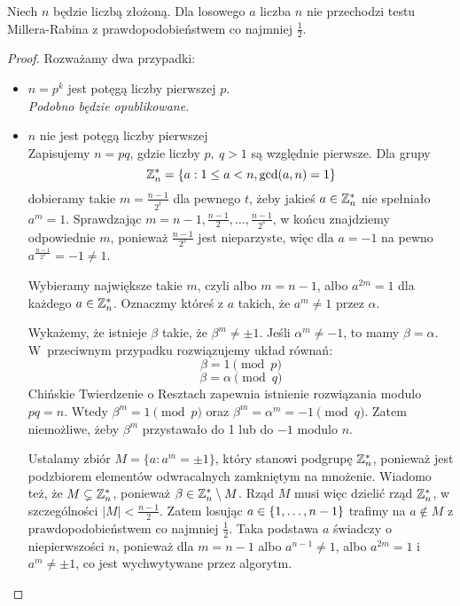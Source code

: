 \newpage
\begin{lemma}
    Niech \( n \) będzie liczbą złożoną. Dla losowego \( a \) liczba \( n \) nie przechodzi testu Millera-Rabina z prawdopodobieństwem co najmniej \( \frac{1}{2} \).
\end{lemma}
\begin{proof}
    Rozważamy dwa przypadki:
    \begin{itemize}
        \item \( n = p^k \) jest potęgą liczby pierwszej \( p \). \\
        \textit{Podobno będzie opublikowane.}
        \item \( n \) nie jest potęgą liczby pierwszej \\
        Zapisujemy \( n = pq \), gdzie liczby \( p, \ q > 1 \) są względnie pierwsze.    
        Dla grupy
        \[
            \integer_n^* = \set{a : 1 \le a < n, \gcd(a,n) = 1}
        \]    
        dobieramy takie \( m = \frac{n-1}{2^t} \) dla pewnego \( t \), żeby jakieś \( a \in \mathbb{Z}_n^* \) nie spełniało \( a^m = 1 \).
        Sprawdzając \( m = n-1, \frac{n-1}{2}, \dots, \frac{n-1}{2^s} \), w końcu znajdziemy odpowiednie \( m \), ponieważ \( \frac{n-1}{2^s} \) jest nieparzyste, więc dla \( a = -1\)  na pewno \( a^{\frac{n-1}{2^s}} = -1 \ne 1 \).

	Wybieramy największe takie \( m \), czyli albo \( m = n - 1 \), albo \( a^{2m} = 1 \) dla każdego \( a \in \mathbb{Z}_n^* \). Oznaczmy któreś z \( a \) takich, że \( a^m \neq 1 \) przez \( \alpha \).
    
        Wykażemy, że istnieje \( \beta \) takie, że \( \beta^m \neq \pm 1 \). Jeśli \( \alpha^m \neq -1 \), to mamy \( \beta = \alpha \). W~przeciwnym przypadku rozwiązujemy układ równań:
        \[
            \beta = 1 \pmod{p}
        \]
        \[
            \beta = \alpha \pmod{q}
        \]
        Chińskie Twierdzenie o Resztach zapewnia istnienie rozwiązania modulo \( pq = n \). Wtedy \( \beta^m = 1 \pmod{p} \) oraz \( \beta^m = \alpha^m = -1 \pmod{q} \).
        Zatem niemożliwe, żeby \( \beta^m \) przystawało do 1 lub do \( -1 \) modulo \( n \).
    
        Ustalamy zbiór \( M = \{a : a^m = \pm 1\} \), który stanowi podgrupę \( \mathbb{Z}_n^* \), ponieważ jest podzbiorem elementów odwracalnych zamkniętym na mnożenie.
        Wiadomo też, że \( M \subsetneq \mathbb{Z}_n^* \), ponieważ \( \beta \in \mathbb{Z}_n^* \setminus M \). Rząd \( M \) musi więc dzielić rząd \( \mathbb{Z}_n^* \), w szczególności \( |M| < \frac{n-1}{2} \).
        Zatem losując \( a \in \set{1, \dots, n-1} \) trafimy na \( a \notin M \) z prawdopodobieństwem co najmniej \( \frac{1}{2} \). Taka podstawa \( a \) świadczy o niepierwszości \( n \), ponieważ dla \( m = n-1 \) albo \( a^{n-1} \neq 1 \), albo \( a^{2m} = 1 \) i \( a^m \neq \pm 1 \), co jest wychwytywane przez algorytm.
    \end{itemize}
\end{proof}
